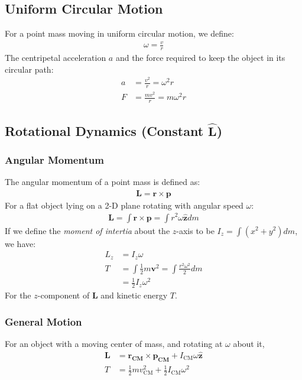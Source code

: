 \documentclass[a4paper]{article}
\newcommand{\ve}[1]{
  \ensuremath{\bm{#1}}}	               %
\newcommand{\uve}[1]{
  \ensuremath{\bm{\hat{#1}}}}          %
\begin{document}
\begin{multicols*}{2}
\subsection{Uniform Circular Motion}
For a point mass moving in uniform circular motion, we define:
\begin{align*}
  \omega=\frac{v}{r}
\end{align*}
The centripetal acceleration $a$ and the force required to keep the object in
its circular path:
\begin{align*}
  a&=\frac{v^2}{r}=\omega^2r\\
  F&=\frac{mv^2}{r}=m\omega^2r
\end{align*}
\subsection{\texorpdfstring{Rotational Dynamics (Constant $\uve{L}$)}{Rotational
    Dynamics (Constant Direction of L)}} %
\subsubsection{Angular Momentum}
The angular momentum of a point mass is defined as:
\begin{align*}
  \ve{L}=\ve{r}\times\ve{p}
\end{align*}
For a flat object lying on a 2-D plane rotating with angular speed $\omega$:
\begin{align*}
  \ve{L}=\int\ve{r}\times\ve{p}=\int r^2\omega \uve{z}dm
\end{align*}
If we define the {\em moment of intertia} about the $z$-axis to be $I_z=\int
(x^2+y^2)dm$, we have:
\begin{align*}
  L_z&=I_z\omega\\
  T&=\int\frac{1}{2}m\ve{v}^2=\int\frac{r^2\omega^2}{2}dm\\
  &=\frac{1}{2}I_z\omega^2
\end{align*}
For the $z$-component of $\ve{L}$ and kinetic energy $T$.
\subsubsection{General Motion}
For an object with a moving center of mass, and rotating at $\omega$ about it,
\begin{align*}
  \ve{L}&=\ve{r_\text{CM}}\times\ve{p_\text{CM}}+I_\text{CM}\omega \uve{z}\\
  T&=\frac{1}{2}mv_\text{CM}^2+\frac{1}{2}I_\text{CM}\omega^2
\end{align*}

\end{multicols*}
\end{document}
